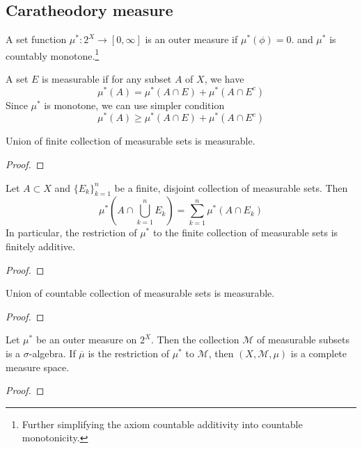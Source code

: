 \subsection{Caratheodory measure}
\begin{definition}
	A set function $\mu^\ast : 2^X \to [0,\infty]$ is an outer measure if $\mu^\ast(\phi) = 0$. and $\mu^\ast$ is countably monotone.\dag\footnote{Further simplifying the axiom countable additivity into countable monotonicity.}
\end{definition}

\begin{definition}
	A set $E$ is measurable if for any subset $A$ of $X$, we have
	$$ \mu^\ast(A) = \mu^\ast(A \cap E) + \mu^\ast(A \cap E^c)$$
	Since $\mu^\ast$ is monotone, we can use simpler condition
	$$ \mu^\ast(A) \ge \mu^\ast(A \cap E) + \mu^\ast(A \cap E^c)$$
\end{definition}

\begin{theorem}
	Union of finite collection of measurable sets is measurable.
\end{theorem}
\begin{proof}
\end{proof}

\begin{theorem}
	Let $A \subset X$ and $\{ E_k \}_{k=1}^n$ be a finite, disjoint collection of measurable sets.
	Then
	$$ \mu^\ast \left( A \cap \bigcup_{k=1}^n E_k \right) = \sum_{k=1}^n \mu^\ast (A \cap E_k) $$
	In particular, the restriction of $\mu^\ast$ to the finite collection of measurable sets is finitely additive.
\end{theorem}
\begin{proof}
\end{proof}

\begin{theorem}
	Union of countable collection of measurable sets is measurable.
\end{theorem}
\begin{proof}
\end{proof}

\begin{theorem}
	Let $\mu^\ast$ be an outer measure on $2^X$.
	Then the collection $\mathcal{M}$ of measurable subsets is a $\sigma$-algebra.
	If $\overline{\mu}$ is the restriction of $\mu^\ast$ to $\mathcal{M}$, then $(X,\mathcal{M},\mu)$ is a complete measure space.
\end{theorem}
\begin{proof}
\end{proof}

